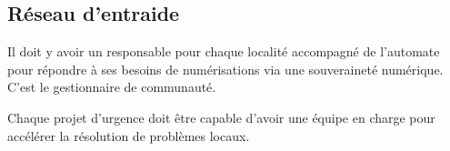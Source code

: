 \subsection{Réseau d’entraide}

Il doit y avoir un responsable pour chaque localité accompagné de l’automate pour répondre à ses besoins de numérisations via une souveraineté numérique. C’est le gestionnaire de communauté.

Chaque projet d’urgence doit être capable d’avoir une équipe en charge pour accélérer la résolution de problèmes locaux.





